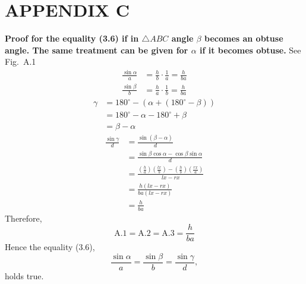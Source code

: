 \documentclass[12pt]{report}
\begin{document}
\section*{APPENDIX C} \textbf{Proof for the equality (3.6) if in $\triangle ABC$ angle $\beta$ becomes an obtuse angle. The same treatment can be given for $\alpha$ if it becomes obtuse.} \vspace{0.3cm} See Fig.~A.1 \begin{align} \frac{\sin\alpha}{a} &= \frac{h}{b}\cdot\frac{1}{a} = \frac{h}{ba} \tag{A.1} \\[4mm] \frac{\sin\beta}{b} &= \frac{h}{a}\cdot\frac{1}{b} = \frac{h}{ba} \tag{A.2} \end{align} \begin{align} \gamma &= 180^\circ-\left(\alpha+\left(180^\circ-\beta\right)\right) \\ &= 180^\circ-\alpha-180^\circ+\beta \\ &= \beta-\alpha \end{align} \begin{align} \frac{\sin\gamma}{d} &= \frac{\sin(\beta-\alpha)}{d} \\[2mm] &= \frac{\sin\beta\cos\alpha- \cos\beta\sin\alpha}{d} \\[2mm] &= \frac{ \left(\frac{h}{a}\right)\left(\frac{lx}{b}\right) - \left(\frac{h}{b}\right)\left(\frac{rx}{a}\right)} {lx-rx} \\[2mm] &= \frac{h(lx-rx)} {ba(lx-rx)} \\[2mm] &= \frac{h}{ba} \tag{A.3} \end{align} Therefore, \[ \text{A.1} = \text{A.2} = \text{A.3} = \frac{h}{ba} \] Hence the equality (3.6), \begin{equation} \frac{\sin\alpha}{a} = \frac{\sin\beta}{b} = \frac{\sin\gamma}{d}, \tag{3.6} \end{equation} holds true.




 
\end{document}
